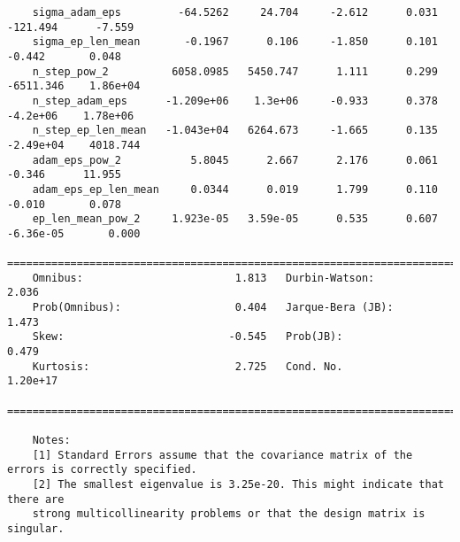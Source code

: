 \begin{verbatim}
    sigma_adam_eps         -64.5262     24.704     -2.612      0.031    -121.494      -7.559
    sigma_ep_len_mean       -0.1967      0.106     -1.850      0.101      -0.442       0.048
    n_step_pow_2          6058.0985   5450.747      1.111      0.299   -6511.346    1.86e+04
    n_step_adam_eps      -1.209e+06    1.3e+06     -0.933      0.378    -4.2e+06    1.78e+06
    n_step_ep_len_mean   -1.043e+04   6264.673     -1.665      0.135   -2.49e+04    4018.744
    adam_eps_pow_2           5.8045      2.667      2.176      0.061      -0.346      11.955
    adam_eps_ep_len_mean     0.0344      0.019      1.799      0.110      -0.010       0.078
    ep_len_mean_pow_2     1.923e-05   3.59e-05      0.535      0.607   -6.36e-05       0.000
    ==============================================================================
    Omnibus:                        1.813   Durbin-Watson:                   2.036
    Prob(Omnibus):                  0.404   Jarque-Bera (JB):                1.473
    Skew:                          -0.545   Prob(JB):                        0.479
    Kurtosis:                       2.725   Cond. No.                     1.20e+17
    ==============================================================================

    Notes:
    [1] Standard Errors assume that the covariance matrix of the errors is correctly specified.
    [2] The smallest eigenvalue is 3.25e-20. This might indicate that there are
    strong multicollinearity problems or that the design matrix is singular.
\end{verbatim}